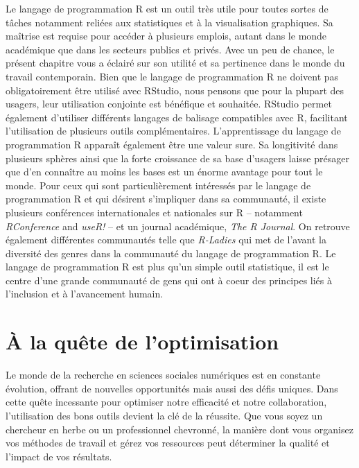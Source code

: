 \documentclass[
  letterpaper,
]{scrbook}
\begin{document}
Le langage de programmation R est un outil très utile pour toutes sortes
de tâches notamment reliées aux statistiques et à la visualisation
graphiques. Sa maîtrise est requise pour accéder à plusieurs emplois,
autant dans le monde académique que dans les secteurs publics et privés.
Avec un peu de chance, le présent chapitre vous a éclairé sur son
utilité et sa pertinence dans le monde du travail contemporain. Bien que
le langage de programmation R ne doivent pas obligatoirement être
utilisé avec RStudio, nous pensons que pour la plupart des usagers, leur
utilisation conjointe est bénéfique et souhaitée. RStudio permet
également d'utiliser différents langages de balisage compatibles avec R,
facilitant l'utilisation de plusieurs outils complémentaires.
L'apprentissage du langage de programmation R apparaît également être
une valeur sure. Sa longitivité dans plusieurs sphères ainsi que la
forte croissance de sa base d'usagers laisse présager que d'en connaître
au moins les bases est un énorme avantage pour tout le monde. Pour ceux
qui sont particulièrement intéressés par le langage de programmation R
et qui désirent s'impliquer dans sa communauté, il existe plusieurs
conférences internationales et nationales sur R -- notamment
\emph{RConference} and \emph{useR!} -- et un journal académique,
\emph{The R Journal}. On retrouve également différentes communautés
telle que \emph{R-Ladies} qui met de l'avant la diversité des genres
dans la communauté du langage de programmation R. Le langage de
programmation R est plus qu'un simple outil statistique, il est le
centre d'une grande communauté de gens qui ont à coeur des principes
liés à l'inclusion et à l'avancement humain.


\hypertarget{sec-chap8}{%
\chapter{À la quête de l'optimisation}\label{sec-chap8}}

Le monde de la recherche en sciences sociales numériques est en
constante évolution, offrant de nouvelles opportunités mais aussi des
défis uniques. Dans cette quête incessante pour optimiser notre
efficacité et notre collaboration, l'utilisation des bons outils devient
la clé de la réussite. Que vous soyez un chercheur en herbe ou un
professionnel chevronné, la manière dont vous organisez vos méthodes de
travail et gérez vos ressources peut déterminer la qualité et l'impact
de vos résultats.
\end{document}
